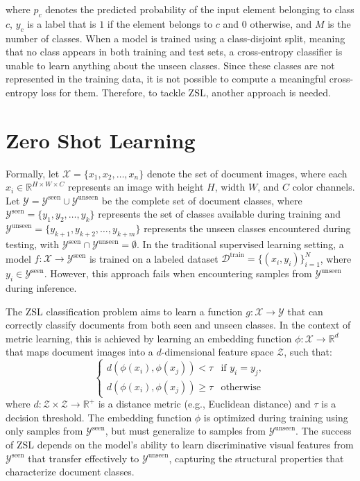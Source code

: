 where $p_{c}$ denotes the predicted probability of the input element belonging to class $c$, $y_{c}$ is a label that is $1$ if the element belongs to $c$ and $0$ otherwise, and $M$ is the number of classes. When a model is trained using a class-disjoint split, meaning that no class appears in both training and test sets, a cross-entropy classifier is unable to learn anything about the unseen classes. Since these classes are not represented in the training data, it is not possible to compute a meaningful cross-entropy loss for them. Therefore, to tackle \gls{ZSL}, another approach is needed.

\section{Zero Shot Learning}
\label{sec:zsl}

Formally, let $\mathcal{X} = \{x_1, x_2, \ldots, x_n\}$ denote the set of document images, where each $x_i \in \mathbb{R}^{H \times W \times C}$ represents an image with height $H$, width $W$, and $C$ color channels. Let $\mathcal{Y} = \mathcal{Y}^{\text{seen}} \cup \mathcal{Y}^{\text{unseen}}$ be the complete set of document classes, where $\mathcal{Y}^{\text{seen}} = \{y_1, y_2, \ldots, y_k\}$ represents the set of classes available during training and $\mathcal{Y}^{\text{unseen}} = \{y_{k+1}, y_{k+2}, \ldots, y_{k+m}\}$ represents the unseen classes encountered during testing, with $\mathcal{Y}^{\text{seen}} \cap \mathcal{Y}^{\text{unseen}} = \emptyset$. In the traditional supervised learning setting, a model $f: \mathcal{X} \rightarrow \mathcal{Y}^{\text{seen}}$ is trained on a labeled dataset $\mathcal{D}^{\text{train}} = \{(x_i, y_i)\}_{i=1}^{N}$, where $y_i \in \mathcal{Y}^{\text{seen}}$. However, this approach fails when encountering samples from $\mathcal{Y}^{\text{unseen}}$ during inference.

The \gls{ZSL} classification problem aims to learn a function $g: \mathcal{X} \rightarrow \mathcal{Y}$ that can correctly classify documents from both seen and unseen classes. In the context of metric learning, this is achieved by learning an embedding function $\phi: \mathcal{X} \rightarrow \mathbb{R}^d$ that maps document images into a $d$-dimensional feature space $\mathcal{Z}$, such that:
\begin{equation} \label{eq_locomotion}
    \begin{cases}
     d(\phi(x_i), \phi(x_j)) < \tau & \text{if } y_i = y_j, \\
     d(\phi(x_i), \phi(x_j)) \geq \tau &  \text{otherwise}
    \end{cases}
\end{equation}
where $d: \mathcal{Z} \times \mathcal{Z} \rightarrow \mathbb{R}^+$ is a distance metric (e.g., Euclidean distance) and $\tau$ is a decision threshold. The embedding function $\phi$ is optimized during training using only samples from $\mathcal{Y}^{\text{seen}}$, but must generalize to samples from $\mathcal{Y}^{\text{unseen}}$. The success of \gls{ZSL} depends on the model's ability to learn discriminative visual features from $\mathcal{Y}^{\text{seen}}$ that transfer effectively to $\mathcal{Y}^{\text{unseen}}$, capturing the structural properties that characterize document classes.

